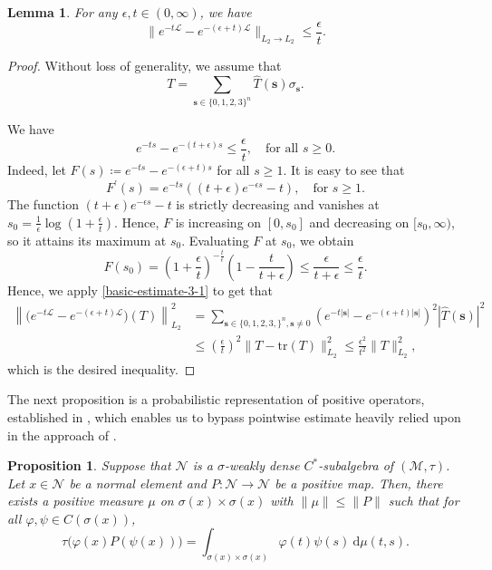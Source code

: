 \documentclass{amsbook}
\newtheorem{proposition}[theorem]{Proposition}
\newtheorem{lemma}[theorem]{Lemma}
\theoremstyle{definition}
\theoremstyle{remark}
\numberwithin{section}{chapter}
\numberwithin{equation}{chapter}
\newcommand{\1}{\mathbf{1}}
\newcommand{\s}{\mathbf{s}}
\begin{document}
\begin{lemma}\label{ete-22}
For any $\epsilon,t\in (0,\infty)$, we have
\[
\|e^{-t\mathcal{L}}-e^{-(\epsilon+t)\mathcal{L}}\|_{L_2\to L_2}\leq \frac{\epsilon}{t}.
\]
\end{lemma}
\begin{proof}
Without loss of generality, we assume that
\[
T=\sum_{\s\in\{0,1,2,3\}^{n}}\widehat{T}(\s)\sigma_{\s}.
\]

We have
\begin{equation}\label{basic-estimate-3-1}
e^{-ts}-e^{-(t+\epsilon)s}\leq \frac{\epsilon}{t},\quad\mbox{for all }s\geq 0.
\end{equation}
Indeed, let $F(s)\coloneqq e^{-ts}-e^{-(\epsilon+t)s}$ for all $s\geq 1$. It is easy to see that
\[
F^{\prime}(s)=e^{-ts}\left((t+\epsilon)e^{-\epsilon s}-t\right),\quad\mbox{for }s\geq 1.
\]
The function $(t+\epsilon)e^{-\epsilon s}-t$ is strictly decreasing and
vanishes at $s_{0}=\frac{1}{\epsilon}\log\left(1+\frac{\epsilon}{t}\right)$.  Hence, $F$ is increasing on $[0,s_0]$ and decreasing on
$[s_0,\infty)$, so it attains its maximum at $s_0$. Evaluating $F$ at
$s_0$, we obtain
\[
F(s_{0})=\left(1+\frac{\epsilon}{t}\right)^{-\frac{t}{\epsilon}}\left(1-\frac{t}{t+\epsilon}\right)\leq \frac{\epsilon}{t+\epsilon}\leq \frac{\epsilon}{t}.
\]
Hence, we apply  \eqref{basic-estimate-3-1} to get that
\begin{align*}
\left\|\big(e^{-t\mathcal{L}}-e^{-(\epsilon+t)\mathcal{L}}\big)(T)\right\|^{2}_{L_{2}}&=\sum_{\s\in \{0,1,2,3,\}^{n},\s\neq 0}(e^{-t|\s|}-e^{-(\epsilon+t)|\s|})^{2}\left|\widehat{T}(\s)\right|^{2}\\
&\leq \left(\frac{\epsilon}{t}\right)^{2}\|T-\mathrm{tr}(T)\|^{2}_{L_{2}}\leq \frac{\epsilon^{2}}{t^{2}}\|T\|^{2}_{L_{2}},
\end{align*}
which is the desired inequality.
\end{proof}


The next proposition is a probabilistic representation of positive operators, established in \cite[Lemma 4.5]{Xi2017}, which enables us to bypass pointwise estimate heavily relied upon in the approach of \cite{HMO2017}.

\begin{proposition}\label{tr-var-psi}
Suppose that $\mathcal{N}$ is a $\sigma$-weakly dense $C^*$-subalgebra of $(\mathcal{M},\tau)$. Let $x \in \mathcal{N}$ be a normal element and $P : \mathcal{N} \to \mathcal{N}$ be a positive map. Then, there exists a positive measure $\mu$ on $\sigma(x) \times \sigma(x)$ with $\|\mu\| \leq \|P\|$ such that for all $\varphi, \psi \in C(\sigma(x))$,
\[
\tau\bigl(\varphi(x)P(\psi(x))\bigr)=\int_{\sigma(x) \times \sigma(x)} \varphi(t)\psi(s)\mathrm{~d}\mu(t,s).
\]
\end{proposition}
\end{document}
